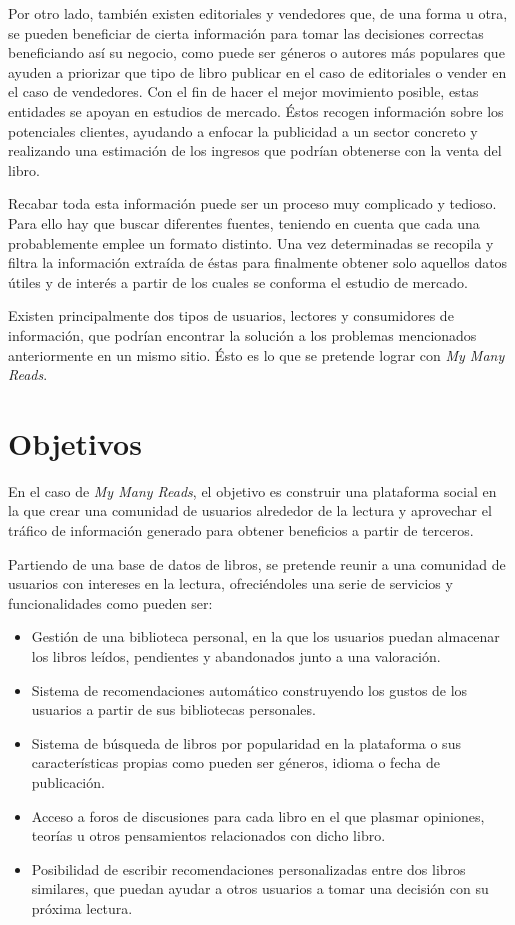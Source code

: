 Por otro lado, también existen editoriales y vendedores que, de una forma u otra, se pueden beneficiar de cierta información para tomar las decisiones correctas beneficiando así su negocio, como puede ser géneros o autores más populares que ayuden a priorizar que tipo de libro publicar en el caso de editoriales o vender en el caso de vendedores. Con el fin de hacer el mejor movimiento posible, estas entidades se apoyan en estudios de mercado. Éstos recogen información sobre los potenciales clientes, ayudando a enfocar la publicidad a un sector concreto y realizando una estimación de los ingresos que podrían obtenerse con la venta del libro.

Recabar toda esta información puede ser un proceso muy complicado y tedioso. Para ello hay que buscar diferentes fuentes, teniendo en cuenta que cada una probablemente emplee un formato distinto. Una vez determinadas se  recopila y filtra la información extraída de éstas para finalmente obtener solo aquellos datos útiles y de interés a partir de los cuales se conforma el estudio de mercado.

Existen principalmente dos tipos de usuarios, lectores y consumidores de información, que podrían encontrar la solución a los problemas mencionados anteriormente en un mismo sitio. Ésto es lo que se pretende lograr con \textit{My Many Reads}.

\section{Objetivos}
En el caso de \textit{My Many Reads}, el objetivo es construir una plataforma social en la que crear una comunidad de usuarios alrededor de la lectura y aprovechar el tráfico de información generado para obtener beneficios a partir de terceros. 

Partiendo de una base de datos de libros, se pretende reunir a una comunidad de usuarios con intereses en la lectura, ofreciéndoles una serie de servicios y funcionalidades como pueden ser:

\begin{itemize}
    \item Gestión de una biblioteca personal, en la que los usuarios puedan almacenar los libros leídos, pendientes y abandonados junto a una valoración.
    \item Sistema de recomendaciones automático construyendo los gustos de los usuarios a partir de sus bibliotecas personales.
    \item Sistema de búsqueda de libros por popularidad en la plataforma o sus características propias como pueden ser géneros, idioma o fecha de publicación.
    \item Acceso a foros de discusiones para cada libro en el que plasmar opiniones, teorías u otros pensamientos relacionados con dicho libro.
    \item Posibilidad de escribir recomendaciones personalizadas entre dos libros similares, que puedan ayudar a otros usuarios a tomar una decisión con su próxima lectura.
\end{itemize}

